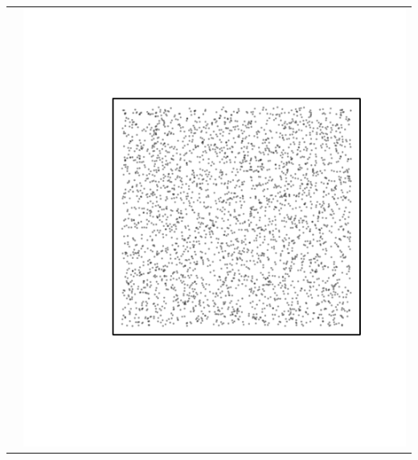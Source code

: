 \documentclass{article}\usepackage{graphicx, color}
\makeatletter
\def\maxwidth{ %
  \ifdim\Gin@nat@width>\linewidth
    \linewidth
  \else
    \Gin@nat@width
  \fi
}
\newenvironment{knitrout}{}{} %
\makeatother
\begin{document}
\begin{tabular}{cc}
&
\begin{knitrout}
\definecolor{shadecolor}{rgb}{0.969, 0.969, 0.969}\color{fgcolor}\includegraphics[width=\maxwidth]{figure/unnamed-chunk-2} 
\end{knitrout}

\\
\end{tabular}
\end{document}
